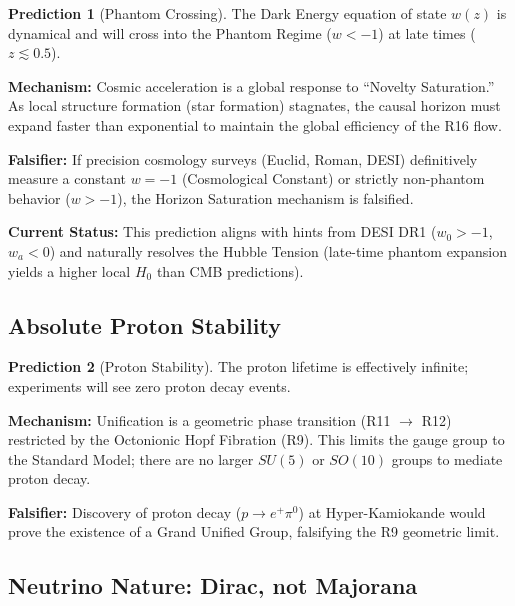 \documentclass[11pt,a4paper]{article}
\theoremstyle{definition}
\newtheorem{prediction}{Prediction}
\theoremstyle{plain}
\theoremstyle{remark}
\begin{document}
\begin{prediction}[Phantom Crossing]
The Dark Energy equation of state $w(z)$ is dynamical and will cross into the Phantom Regime ($w < -1$) at late times ($z \lesssim 0.5$).
\end{prediction}

\textbf{Mechanism:} Cosmic acceleration is a global response to ``Novelty Saturation.'' As local structure formation (star formation) stagnates, the causal horizon must expand faster than exponential to maintain the global efficiency of the R16 flow.

\textbf{Falsifier:} If precision cosmology surveys (Euclid, Roman, DESI) definitively measure a constant $w = -1$ (Cosmological Constant) or strictly non-phantom behavior ($w > -1$), the Horizon Saturation mechanism is falsified.

\textbf{Current Status:} This prediction aligns with hints from DESI DR1 ($w_0 > -1$, $w_a < 0$) and naturally resolves the Hubble Tension (late-time phantom expansion yields a higher local $H_0$ than CMB predictions).

\subsection{Absolute Proton Stability}

\begin{prediction}[Proton Stability]
The proton lifetime is effectively infinite; experiments will see zero proton decay events.
\end{prediction}

\textbf{Mechanism:} Unification is a geometric phase transition (R11 $\to$ R12) restricted by the Octonionic Hopf Fibration (R9). This limits the gauge group to the Standard Model; there are no larger $SU(5)$ or $SO(10)$ groups to mediate proton decay.

\textbf{Falsifier:} Discovery of proton decay ($p \to e^+ \pi^0$) at Hyper-Kamiokande would prove the existence of a Grand Unified Group, falsifying the R9 geometric limit.

\subsection{Neutrino Nature: Dirac, not Majorana}
\end{document}
